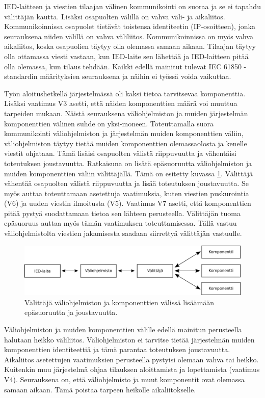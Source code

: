 IED-laitteen ja viestien tilaajan välinen kommunikointi on suoraa ja se ei tapahdu välittäjän kautta. Lisäksi osapuolten välillä on vahva väli- ja aikaliitos. Kommunikoinnissa osapuolet tietävät toistensa identiteetin (IP-osoitteen), jonka seurauksena niiden välillä on vahva väliliitos. Kommunikoinnissa on myös vahva aikaliitos, koska osapuolien täytyy olla olemassa samaan aikaan. Tilaajan täytyy olla ottamassa viesti vastaan, kun IED-laite sen lähettää ja IED-laitteen pitää olla olemassa, kun tilaus tehdään. Kaikki edellä mainitut tulevat IEC 61850 -standardin määrityksien seurauksena ja näihin ei työssä voida vaikuttaa.

Työn aloitushetkellä järjestelmässä oli kaksi tietoa tarvitsevaa komponenttia. Lisäksi vaatimus V3 asetti, että näiden komponenttien määrä voi muuttua tarpeiden mukaan. Näistä seurauksena väliohjelmiston ja muiden järjestelmän komponenttien välinen suhde on yksi-moneen. Toteuttamalla suora kommunikointi väliohjelmiston ja järjestelmän muiden komponenttien väliin, väliohjelmiston täytyy tietää muiden komponenttien olemassaolosta ja kenelle viestit ohjataan. Tämä lisäisi osapuolten välistä riippuvuutta ja vähentäisi toteutuksen joustavuutta. Ratkaisuna on lisätä epäsuoruutta väliohjelmiston ja muiden komponenttien väliin välittäjällä. Tämä on esitetty kuvassa \ref{fig:coupling-analysis}. Välittäjä vähentää osapuolten välistä riippuvuutta ja lisää toteutuksen joustavuutta. Se myös auttaa toteuttamaan asetettuja vaatimuksia, kuten viestien puskurointia (V6) ja uuden viestin ilmoitusta (V5). Vaatimus V7 asetti, että komponenttien pitää pystyä suodattamaan tietoa sen lähteen perusteella. Välittäjän tuoma epäsuoruus auttaa myös tämän vaatimuksen toteuttamisessa. Tällä vastuu väliohjelmistolta viestien jakamisesta saadaan siirrettyä välittäjän vastuulle.

\begin{figure}[ht!]
	\includegraphics[width=1\textwidth]{pictures/coupling-analysis.png}
	\caption{Välittäjä väliohjelmiston ja komponenttien välissä lisäämään epäsuoruutta ja joustavuutta.}
	\label{fig:coupling-analysis}
\end{figure}

Väliohjelmiston ja muiden komponenttien välille edellä mainitun perusteella halutaan heikko väliliitos. Väliohjelmiston ei tarvitse tietää järjestelmän muiden komponenttien identiteettiä ja tämä parantaa toteutuksen joustavuutta. Aikaliitos asetettujen vaatimuksien perusteella pystyisi olemaan vahva tai heikko. Kuitenkin muu järjestelmä ohjaa tilauksen aloittamista ja lopettamista (vaatimus V4). Seurauksena on, että väliohjelmisto ja muut komponentit ovat olemassa samaan aikaan. Tämä poistaa tarpeen heikolle aikaliitokselle.

